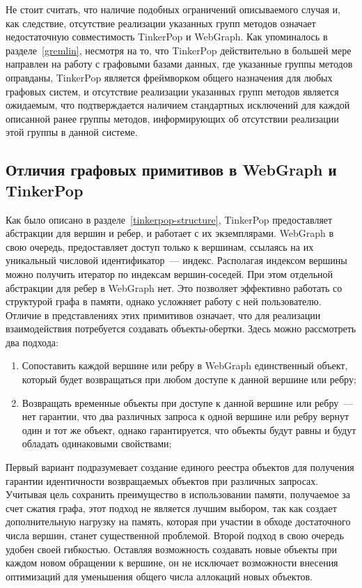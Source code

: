 \documentclass[times,specification,annotation]{itmo-student-thesis}
\begin{document}
Не стоит считать, что наличие подобных ограничений описываемого случая и, как следствие, отсутствие реализации указанных групп методов означает недостаточную совместимость TinkerPop и WebGraph. Как упоминалось в разделе~\ref{gremlin}, несмотря на то, что TinkerPop действительно в большей мере направлен на работу с графовыми базами данных, где указанные группы методов оправданы, TinkerPop является фреймворком общего назначения для любых графовых систем, и отсутствие реализации указанных групп методов является ожидаемым, что подтверждается наличием стандартных исключений для каждой описанной ранее группы методов, информирующих об отсутствии реализации этой группы в данной системе.

\subsection{Отличия графовых примитивов в WebGraph и TinkerPop}

Как было описано в разделе~\ref{tinkerpop-structure}, TinkerPop предоставляет абстракции для вершин и ребер, и работает с их экземплярами. WebGraph в свою очередь, предоставляет доступ только к вершинам, ссылаясь на их уникальный числовой идентификатор~--- индекс. Располагая индексом вершины можно получить итератор по индексам вершин-соседей. При этом отдельной абстракции для ребер в WebGraph нет. Это позволяет эффективно работать со структурой графа в памяти, однако усложняет работу с ней пользователю. Отличие в представлениях этих примитивов означает, что для реализации взаимодействия потребуется создавать объекты-обертки. Здесь можно рассмотреть два подхода:
\begin{enumerate}
    \item Сопоставить каждой вершине или ребру в WebGraph единственный объект, который будет возвращаться при любом доступе к данной вершине или ребру;
    \item Возвращать временные объекты при доступе к данной вершине или ребру~--- нет гарантии, что два различных запроса к одной вершине или ребру вернут один и тот же объект, однако гарантируется, что объекты будут равны и будут обладать одинаковыми свойствами;
\end{enumerate}

Первый вариант подразумевает создание единого реестра объектов для получения гарантии идентичности возвращаемых объектов при различных запросах. Учитывая цель сохранить преимущество в использовании памяти, получаемое за счет сжатия графа, этот подход не является лучшим выбором, так как создает дополнительную нагрузку на память, которая при участии в обходе достаточного числа вершин, станет существенной проблемой.
Второй подход в свою очередь удобен своей гибкостью. Оставляя возможность создавать новые объекты при каждом новом обращении к вершине, он не исключает возможности внесения оптимизаций для уменьшения общего числа аллокаций новых объектов.
\end{document}

